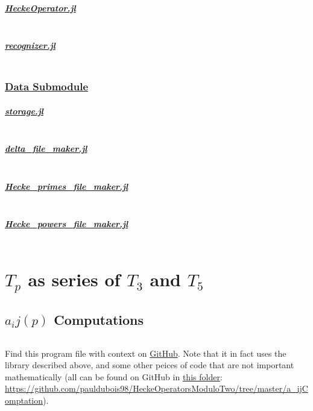 \subparagraph{\href{https://github.com/pauldubois98/ModularFormsModuloTwo.jl/blob/master/src/HeckeOperator.jl}{HeckeOperator.jl}}
\label{code:HeckeOperator}
\inputminted[breaklines]{julia}{Module/HeckeOperator.jl}

\subparagraph{\href{https://github.com/pauldubois98/ModularFormsModuloTwo.jl/blob/master/src/recognizer.jl}{recognizer.jl}}
\label{code:recognizer}
\inputminted[breaklines]{julia}{Module/recognizer.jl}


\subsubsection[Data Submodule] {\href{https://github.com/pauldubois98/ModularFormsModuloTwo.jl/tree/master/src/data}{Data Submodule}}
\subparagraph{\href{https://github.com/pauldubois98/ModularFormsModuloTwo.jl/blob/master/src/data/storage.jl}{storage.jl}}
\label{code:storage}
\inputminted[breaklines]{julia}{Module/storage.jl}

\subparagraph{\href{https://github.com/pauldubois98/ModularFormsModuloTwo.jl/blob/master/src/data/delta_file_maker.jl}{delta\_file\_maker.jl}}
\label{code:deltaFileMaker}
\inputminted[breaklines]{julia}{Module/deltaFileMaker.jl}

\subparagraph{\href{https://github.com/pauldubois98/ModularFormsModuloTwo.jl/blob/master/src/data/Hecke_primes_file_maker.jl}{Hecke\_primes\_file\_maker.jl}}
\label{code:HeckePrimesFileMaker}
\inputminted[breaklines]{julia}{Module/HeckePrimesFileMaker.jl}

\subparagraph{\href{https://github.com/pauldubois98/ModularFormsModuloTwo.jl/blob/master/src/data/Hecke_powers_file_maker.jl}{Hecke\_powers\_file\_maker.jl}}
\label{code:HeckePowersFileMaker}
\inputminted[breaklines]{julia}{Module/HeckePowersFileMaker.jl}



\section{$T_p$ as series of $T_3$ and $T_5$}
\subsection{$a_ij(p)$ Computations}
\label{code:a_ij(p)calculation}
\inputminted[breaklines]{julia}{Module/HeckePowersFileMaker.jl}
Find this program file with context on \href{https://github.com/pauldubois98/HeckeOperatorsModuloTwo/blob/master/a_ijComptation/T3T5_series_coef.jl}{GitHub}.
Note that it in fact uses the library described above, and some other peices of code that are not important mathematically (all can be found on GitHub in \href{https://github.com/pauldubois98/HeckeOperatorsModuloTwo/tree/master/a_ijComptation}{this folder}: \url{https://github.com/pauldubois98/HeckeOperatorsModuloTwo/tree/master/a_ijComptation}).

